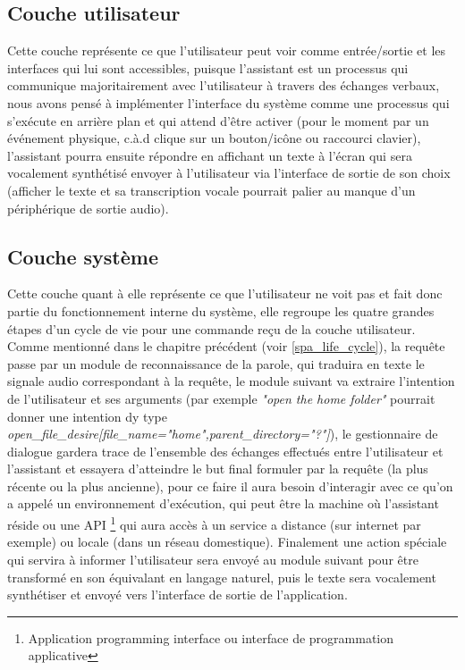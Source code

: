 	\subsection{Couche utilisateur}
	Cette couche représente ce que l'utilisateur peut voir comme entrée/sortie et les interfaces qui lui sont accessibles, puisque l'assistant est un processus qui communique majoritairement avec l'utilisateur à travers des échanges verbaux, nous avons pensé à implémenter l'interface du système comme une processus qui s'exécute en arrière plan et qui attend d'être activer (pour le moment par un événement physique, c.à.d clique sur un bouton/icône ou raccourci clavier), l'assistant pourra ensuite répondre en affichant un texte à l'écran qui sera vocalement synthétisé envoyer à l'utilisateur via l'interface de sortie de son choix (afficher le texte et sa transcription vocale pourrait palier au manque d'un périphérique de sortie audio).
	\subsection{Couche système }
	Cette couche quant à elle représente ce que l'utilisateur ne voit pas et fait donc partie du fonctionnement interne du système, elle regroupe les quatre grandes étapes d'un cycle de vie pour une commande reçu de la couche utilisateur. Comme mentionné dans le chapitre précédent (voir \ref{spa_life_cycle}), la requête passe par un module de reconnaissance de la parole, qui traduira en texte le signale audio correspondant à la requête, le module suivant va extraire l'intention de l'utilisateur et ses arguments (par exemple \textit{"open the home folder"} pourrait donner  une intention dy type  \textit{open\_file\_desire[file\_name="home",parent\_directory="?"]}), le gestionnaire de dialogue gardera trace de l'ensemble des échanges effectués entre l'utilisateur et l'assistant et essayera d'atteindre le but final formuler par la requête (la plus récente ou la plus ancienne), pour ce faire il aura besoin d'interagir avec ce qu'on a appelé un environnement d'exécution, qui peut être la machine où l'assistant réside ou une API \footnote{Application programming interface ou interface de programmation applicative } qui aura accès à un service a distance (sur internet par exemple) ou locale (dans un réseau domestique). Finalement une action spéciale qui servira à informer l'utilisateur sera envoyé au module suivant pour être transformé en son équivalant en langage naturel, puis le texte sera vocalement synthétiser et envoyé vers l'interface de sortie de l'application.
	
